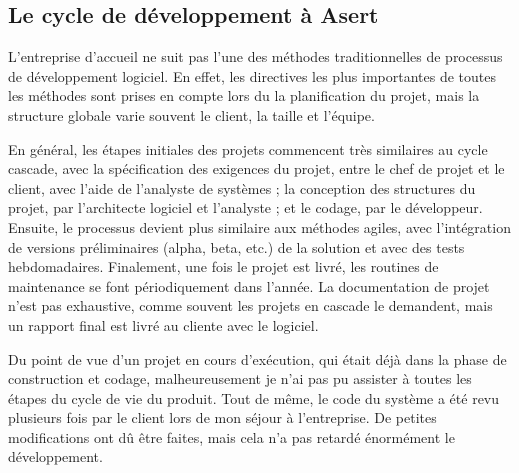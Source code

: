 \subsection{Le cycle de développement à Asert}

L'entreprise d'accueil ne suit pas l'une des méthodes traditionnelles de processus de développement logiciel. En effet, les directives les plus importantes de toutes les méthodes sont prises en compte lors du la planification du projet, mais la structure globale varie souvent le client, la taille et l'équipe.

En général, les étapes initiales des projets commencent très similaires au cycle cascade, avec la spécification des exigences du projet, entre le chef de projet et le client, avec l'aide de l'analyste de systèmes ; la conception des structures du projet, par l'architecte logiciel et l'analyste ; et le codage, par le développeur. Ensuite, le processus devient plus similaire aux méthodes agiles, avec l'intégration de versions préliminaires (alpha, beta, etc.) de la solution et avec des tests hebdomadaires. Finalement, une fois le projet est livré, les routines de maintenance se font périodiquement dans l'année. La documentation de projet n'est pas exhaustive, comme souvent les projets en cascade le demandent, mais un rapport final est livré au cliente avec le logiciel.

Du point de vue d'un projet en cours d'exécution, qui était déjà dans la phase de construction et codage, malheureusement je n'ai pas pu assister à toutes les étapes du cycle de vie du produit. Tout de même, le code du système a été revu plusieurs fois par le client lors de mon séjour à l'entreprise. De petites modifications ont dû être faites, mais cela n'a pas retardé énormément le développement.